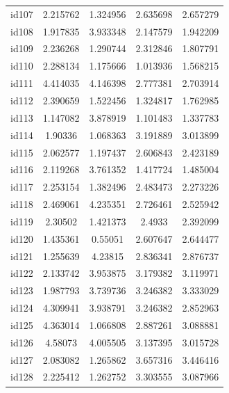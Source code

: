 \documentclass[num-refs]{wiley-article}
\begin{document}
\begin{center}
\begin{longtable}{ccccc}
id107     & 2.215762  & 1.324956       & 2.635698          & 2.657279          \\
id108     & 1.917835  & 3.933348       & 2.147579          & 1.942209          \\
id109     & 2.236268  & 1.290744       & 2.312846          & 1.807791          \\
id110     & 2.288134  & 1.175666       & 1.013936          & 1.568215          \\
id111     & 4.414035  & 4.146398       & 2.777381          & 2.703914          \\
id112     & 2.390659  & 1.522456       & 1.324817          & 1.762985          \\
id113     & 1.147082  & 3.878919       & 1.101483          & 1.337783          \\
id114     & 1.90336   & 1.068363       & 3.191889          & 3.013899          \\
id115     & 2.062577  & 1.197437       & 2.606843          & 2.423189          \\
id116     & 2.119268  & 3.761352       & 1.417724          & 1.485004          \\
id117     & 2.253154  & 1.382496       & 2.483473          & 2.273226          \\
id118     & 2.469061  & 4.235351       & 2.726461          & 2.525942          \\
id119     & 2.30502   & 1.421373       & 2.4933            & 2.392099          \\
id120     & 1.435361  & 0.55051        & 2.607647          & 2.644477          \\
id121     & 1.255639  & 4.23815        & 2.836341          & 2.876737          \\
id122     & 2.133742  & 3.953875       & 3.179382          & 3.119971          \\
id123     & 1.987793  & 3.739736       & 3.246382          & 3.333029          \\
id124     & 4.309941  & 3.938791       & 3.246382          & 2.852963          \\
id125     & 4.363014  & 1.066808       & 2.887261          & 3.088881          \\
id126     & 4.58073   & 4.005505       & 3.137395          & 3.015728          \\
id127     & 2.083082  & 1.265862       & 3.657316          & 3.446416          \\
id128     & 2.225412  & 1.262752       & 3.303555          & 3.087966          \\

\end{longtable}
\end{center}
\end{document}
